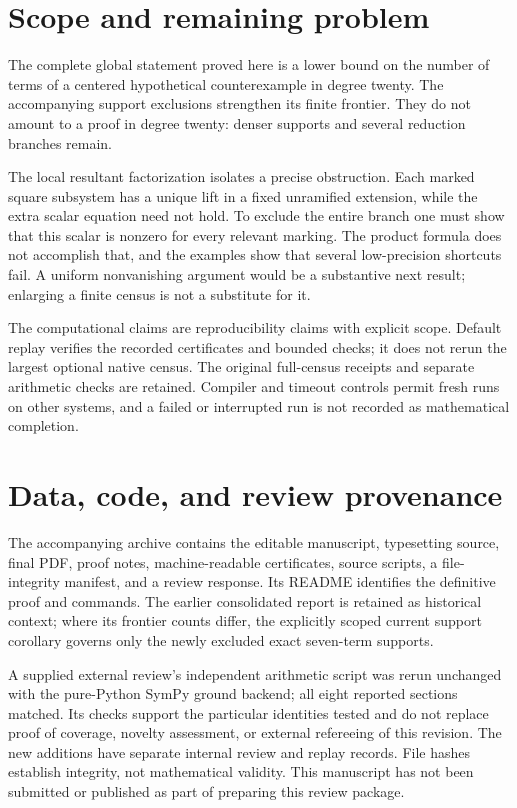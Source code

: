 \documentclass[
  british,
  10pt,
]{article}
\begin{document}
\section{Scope and remaining problem}\label{scope-and-remaining-problem}

The complete global statement proved here is a lower bound on the number
of terms of a centered hypothetical counterexample in degree twenty. The
accompanying support exclusions strengthen its finite frontier. They do
not amount to a proof in degree twenty: denser supports and several
reduction branches remain.

The local resultant factorization isolates a precise obstruction. Each
marked square subsystem has a unique lift in a fixed unramified
extension, while the extra scalar equation need not hold. To exclude the
entire branch one must show that this scalar is nonzero for every
relevant marking. The product formula does not accomplish that, and the
examples show that several low-precision shortcuts fail. A uniform
nonvanishing argument would be a substantive next result; enlarging a
finite census is not a substitute for it.

The computational claims are reproducibility claims with explicit scope.
Default replay verifies the recorded certificates and bounded checks; it
does not rerun the largest optional native census. The original
full-census receipts and separate arithmetic checks are retained.
Compiler and timeout controls permit fresh runs on other systems, and a
failed or interrupted run is not recorded as mathematical completion.

\section{Data, code, and review
provenance}\label{data-code-and-review-provenance}

The accompanying archive contains the editable manuscript, typesetting
source, final PDF, proof notes, machine-readable certificates, source
scripts, a file-integrity manifest, and a review response. Its README
identifies the definitive proof and commands. The earlier consolidated
report is retained as historical context; where its frontier counts
differ, the explicitly scoped current support corollary governs only the
newly excluded exact seven-term supports.

A supplied external review's independent arithmetic script was rerun
unchanged with the pure-Python SymPy ground backend; all eight reported
sections matched. Its checks support the particular identities tested
and do not replace proof of coverage, novelty assessment, or external
refereeing of this revision. The new additions have separate internal
review and replay records. File hashes establish integrity, not
mathematical validity. This manuscript has not been submitted or
published as part of preparing this review package.
\end{document}
